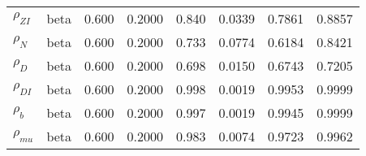 \begin{center}
\begin{longtable}{llcccccc}
${\rho_{ZI}}$ & beta &   0.600 & 0.2000 &   0.840& 0.0339 &  0.7861 &  0.8857 \\ 
${\rho_N}$ & beta &   0.600 & 0.2000 &   0.733& 0.0774 &  0.6184 &  0.8421 \\ 
${\rho_D}$ & beta &   0.600 & 0.2000 &   0.698& 0.0150 &  0.6743 &  0.7205 \\ 
${\rho_{DI}}$ & beta &   0.600 & 0.2000 &   0.998& 0.0019 &  0.9953 &  0.9999 \\ 
${\rho_b}$ & beta &   0.600 & 0.2000 &   0.997& 0.0019 &  0.9945 &  0.9999 \\ 
${\rho_{mu}}$ & beta &   0.600 & 0.2000 &   0.983& 0.0074 &  0.9723 &  0.9962 \\ 
\end{longtable}
 \end{center}

